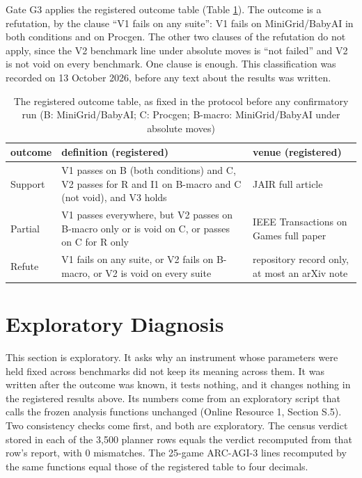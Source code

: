 \documentclass[twocolumn]{svjour3}
\begin{document}
Gate G3 applies the registered outcome table (Table \ref{tab:outcome}).
The outcome is a refutation, by the clause ``V1 fails on any suite'': V1
fails on MiniGrid/BabyAI in both conditions and on Procgen. The other
two clauses of the refutation do not apply, since the V2 benchmark line
under absolute moves is ``not failed'' and V2 is not void on every
benchmark. One clause is enough. This classification was recorded on 13
October 2026, before any text about the results was written.

\begin{table}
\caption{The registered outcome table, as fixed in the protocol before any confirmatory run (B: MiniGrid/BabyAI; C: Procgen; B-macro: MiniGrid/BabyAI under absolute moves)}
\label{tab:outcome}
\begin{tabularx}{\textwidth}{l>{\raggedright\arraybackslash}X>{\raggedright\arraybackslash}X}
\hline
outcome & definition (registered) & venue (registered) \\
\hline
Support & V1 passes on B (both conditions) and C, V2 passes for R and I1 on B-macro and C (not void), and V3 holds & JAIR full article \\
Partial & V1 passes everywhere, but V2 passes on B-macro only or is void on C, or passes on C for R only & IEEE Transactions on Games full paper \\
Refute & V1 fails on any suite, or V2 fails on B-macro, or V2 is void on every suite & repository record only, at most an arXiv note \\
\hline
\end{tabularx}
\end{table}

\section{Exploratory Diagnosis}\label{sec:explore}

This section is exploratory. It asks why an instrument whose parameters
were held fixed across benchmarks did not keep its meaning across them.
It was written after the outcome was known, it tests nothing, and it
changes nothing in the registered results above. Its numbers come from
an exploratory script that calls the frozen analysis functions unchanged
(Online Resource 1, Section S.5). Two consistency checks come first, and
both are exploratory. The census verdict stored in each of the 3,500
planner rows equals the verdict recomputed from that row's report, with
0 mismatches. The 25-game ARC-AGI-3 lines recomputed by the same
functions equal those of the registered table to four decimals.
\end{document}
